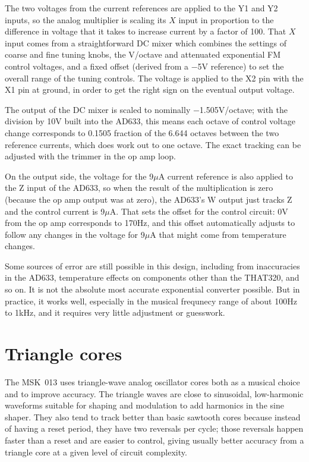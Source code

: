 The two voltages from the current references are applied to the Y1 and Y2
inputs, so the analog multiplier is scaling its $X$ input in proportion to
the difference in voltage that it takes to increase current by a factor of
100.  That $X$ input comes from a straightforward DC mixer which combines
the settings of coarse and fine tuning knobs, the V/octave and attenuated
exponential FM control voltages, and a fixed offset (derived from a $-$5V
reference) to set the overall range of the tuning controls.  The voltage is
applied to the X2 pin with the X1 pin at ground, in order to get the right
sign on the eventual output voltage.

The output of the DC mixer is scaled to nominally $-$1.505V/octave; with the
division by 10V built into the AD633, this means each octave of control
voltage change corresponds to 0.1505 fraction of the 6.644 octaves between
the two reference currents, which does work out to one octave.  The exact
tracking can be adjusted with the trimmer in the op amp loop.

On the output side, the voltage for the 9$\mu$A current reference is also
applied to the Z input of the AD633, so when the result of the
multiplication is zero (because the op amp output was at zero), the AD633's
W output just tracks Z and the control current is 9$\mu$A.  That sets the
offset for the control circuit:  0V from the op amp corresponds to 170Hz,
and this offset automatically adjusts to follow any changes in the voltage
for 9$\mu$A that might come from temperature changes.

Some sources of error are still possible in this design, including from
inaccuracies in the AD633, temperature effects on components other than the
THAT320, and so on.  It is not the absolute most accurate exponential
converter possible.  But in practice, it works well, especially in the
musical frequnecy range of about 100Hz to 1kHz, and it requires very little
adjustment or guesswork.


\section{Triangle cores}

The MSK~013 uses triangle-wave analog oscillator cores both as a musical
choice and to improve accuracy.  The triangle waves are close to sinusoidal,
low-harmonic waveforms suitable for shaping and modulation to add harmonics
in the sine shaper.  They also tend to track better than basic sawtooth
cores because instead of having a reset period, they have two reversals per
cycle; those reversals happen faster than a reset and are easier to control,
giving usually better accuracy from a triangle core at a given level of
circuit complexity.

